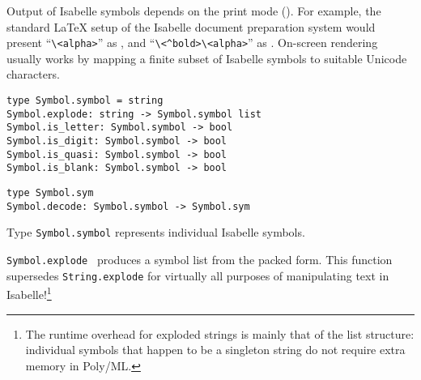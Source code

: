 \begin{isabellebody}
\begin{isamarkuptext}
  \medskip Output of Isabelle symbols depends on the print mode
  ().  For example, the standard {\LaTeX} setup of
  the Isabelle document preparation system would present
  ``\verb,\,\verb,<alpha>,'' as \isa{{\isasymalpha}}, and
  ``\verb,\,\verb,<^bold>,\verb,\,\verb,<alpha>,'' as \isa{\isactrlbold {\isasymalpha}}.  On-screen rendering usually works by mapping a finite
  subset of Isabelle symbols to suitable Unicode characters.%
\end{isamarkuptext}%
\isamarkuptrue%
%
\isadelimmlref
%
\endisadelimmlref
%
\isatagmlref
%
\begin{isamarkuptext}%
\begin{mldecls}
  \verb|type Symbol.symbol = string| \\
  \verb|Symbol.explode: string -> Symbol.symbol list| \\
  \verb|Symbol.is_letter: Symbol.symbol -> bool| \\
  \verb|Symbol.is_digit: Symbol.symbol -> bool| \\
  \verb|Symbol.is_quasi: Symbol.symbol -> bool| \\
  \verb|Symbol.is_blank: Symbol.symbol -> bool| \\
  \end{mldecls}
  \begin{mldecls}
  \verb|type Symbol.sym| \\
  \verb|Symbol.decode: Symbol.symbol -> Symbol.sym| \\
  \end{mldecls}

  \begin{description}

  \item Type \verb|Symbol.symbol| represents individual Isabelle
  symbols.

  \item \verb|Symbol.explode|~ produces a symbol list
  from the packed form.  This function supersedes \verb|String.explode| for virtually all purposes of manipulating text in
  Isabelle!\footnote{The runtime overhead for exploded strings is
  mainly that of the list structure: individual symbols that happen to
  be a singleton string do not require extra memory in Poly/ML.}


\end{description}
\end{isamarkuptext}
\end{isabellebody}
